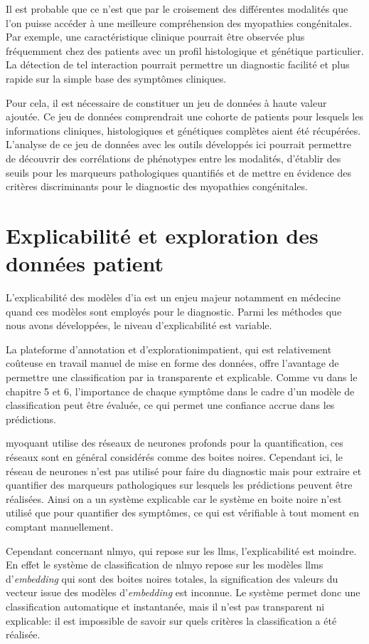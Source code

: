Il est probable que ce n'est que par le croisement des différentes modalités que l'on puisse accéder à une meilleure compréhension des myopathies congénitales. Par exemple, une caractéristique clinique pourrait être observée plus fréquemment chez des patients avec un profil histologique et génétique particulier. La détection de tel interaction pourrait permettre un diagnostic facilité et plus rapide sur la simple base des symptômes cliniques.

Pour cela, il est nécessaire de constituer un jeu de données à haute valeur ajoutée. Ce jeu de données comprendrait une cohorte de patients pour lesquels les informations cliniques, histologiques et génétiques complètes aient été récupérées. L'analyse de ce jeu de données avec les outils développés ici pourrait permettre de découvrir des corrélations de phénotypes entre les modalités, d'établir des seuils pour les marqueurs pathologiques quantifiés et de mettre en évidence des critères discriminants pour le diagnostic des myopathies congénitales.

\section{Explicabilité et exploration des données patient}
L'explicabilité des modèles d'\gls{ia} est un enjeu majeur notamment en médecine quand ces modèles sont employés pour le diagnostic. Parmi les méthodes que nous avons développées, le niveau d'explicabilité est variable.

La plateforme d'annotation et d'exploration\gls{impatient}, qui est relativement coûteuse en travail manuel de mise en forme des données, offre l'avantage de permettre une classification par \gls{ia} transparente et explicable. Comme vu dans le chapitre 5 et 6, l'importance de chaque symptôme dans le cadre d'un modèle de classification peut être évaluée, ce qui permet une confiance accrue dans les prédictions.

\gls{myoquant} utilise des réseaux de neurones profonds pour la quantification, ces réseaux sont en général considérés comme des boites noires. Cependant ici, le réseau de neurones n'est pas utilisé pour faire du diagnostic mais pour extraire et quantifier des marqueurs pathologiques sur lesquels les prédictions peuvent être réalisées. Ainsi on a un système explicable car le système en boite noire n'est utilisé que pour quantifier des symptômes, ce qui est vérifiable à tout moment en comptant manuellement.

Cependant concernant \gls{nlmyo}, qui repose sur les \gls{llms}, l'explicabilité est moindre. En effet le système de classification de \gls{nlmyo} repose sur les modèles \gls{llms} d'\textit{embedding} qui sont des boites noires totales, la signification des valeurs du vecteur issue des modèles d'\textit{embedding} est inconnue. Le système permet donc une classification automatique et instantanée, mais il n'est pas transparent ni explicable: il est impossible de savoir sur quels critères la classification a été réalisée.


